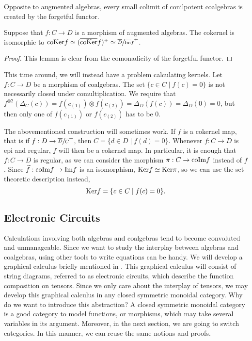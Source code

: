 \documentclass[../thesis.tex]{subfiles}
\begin{document}
                Opposite to augmented algebras, every small colimit of conilpotent coalgebras is created by the forgetful functor.

                \begin{lemma}
                    Suppose that $f: C \rightarrow D$ is a morphism of augmented algebras. The cokernel is isomorphic to $\tt{coKer}f \simeq (\overline{\tt{coKer}}f)^+ \simeq \sfrac{\overline{D}}{\overline{\tt{Im}}f}^+$.
                \end{lemma}

                \begin{proof}
                    This lemma is clear from the comonadicity of the forgetful functor.
                \end{proof}

                This time around, we will instead have a problem calculating kernels. Let $f: C \rightarrow D$ be a morphism of coalgebras. The set $\{c\in C \mid f(c) = 0\}$ is not necessarily closed under comultiplication. We require that $f^{\otimes 2}(\Delta_C(c)) = f(c_{(1)})\otimes f(c_{(2)}) = \Delta_D(f(c)) = \Delta_D(0) = 0$, but then only one of $f(c_{(1)})$ or $f(c_{(2)})$ has to be $0$.

                The abovementioned construction will sometimes work. If $f$ is a cokernel map, that is if $f : D \rightarrow \sfrac{\overline{D}}{\overline{C}}^+$, then $C = \{d\in D \mid f(d) = 0\}$. Whenever $f: C \rightarrow D$ is epi and regular, $f$ will then be a cokernel map. In particular, it is enough that $f: C \rightarrow D$ is regular, as we can consider the morphism $\pi: C \rightarrow \tt{coIm}f$ instead of $f$. Since $\widetilde{f}: \tt{coIm}f \rightarrow \tt{Im}f$ is an isomorphism, $\tt{Ker}f \simeq \tt{Ker}\pi$, so we can use the set-theoretic description instead,
                \begin{align*}
                    \tt{Ker}f = \{c\in C \mid f(c) = 0\}\tt{.}
                \end{align*}

    \subsection{Electronic Circuits}
            Calculations involving both algebras and coalgebras tend to become convoluted and unmanageable. Since we want to study the interplay between algebras and coalgebras, using other tools to write equations can be handy. We will develop a graphical calculus briefly mentioned in \cite{Loday12}. This graphical calculus will consist of string diagrams, referred to as electronic circuits, which describe the function composition on tensors. Since we only care about the interplay of tensors, we may develop this graphical calculus in any closed symmetric monoidal category. Why do we want to introduce this abstraction? A closed symmetric monoidal category is a good category to model functions, or morphisms, which may take several variables in its argument. Moreover, in the next section, we are going to switch categories. In this manner, we can reuse the same notions and proofs.
            
\end{document}
